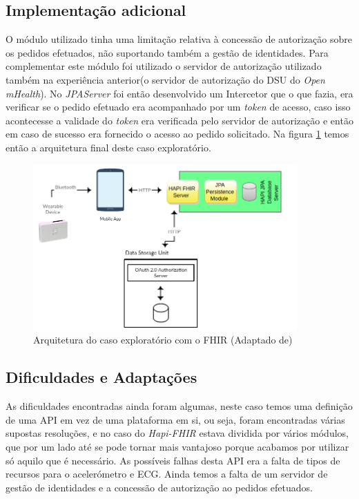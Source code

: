 \subsection{Implementação adicional}
O módulo utilizado tinha uma limitação relativa à concessão de autorização sobre os pedidos efetuados, não suportando também a gestão de identidades. Para complementar este módulo foi utilizado o servidor de autorização utilizado também na experiência anterior(o servidor de autorização do \gls{DSU} do \textit{Open mHealth}).
No \textit{JPAServer} foi então desenvolvido um Intercetor que o que fazia, era verificar se o pedido efetuado era acompanhado por um \textit{token} de acesso, caso isso acontecesse a validade do \textit{token} era verificada pelo servidor de autorização e então em caso de sucesso era fornecido o acesso ao pedido solicitado. Na figura \ref{f:exp-fhir-arch} temos então a arquitetura final deste caso exploratório.
\begin{figure}[H]
  \centering
  \includegraphics[width=0.9\textwidth]{imgs/fhir-arch-exp.png}
  \caption[Arquitetura do caso exploratório com o FHIR]{Arquitetura do caso exploratório com o FHIR (Adaptado de)\cite{hapi-index}}
  
  \label{f:exp-fhir-arch}
\end{figure}

\subsection{Dificuldades e Adaptações}
As dificuldades encontradas ainda foram algumas, neste caso temos uma definição de uma \gls{API} em vez de uma plataforma em si, ou seja, foram encontradas várias supostas resoluções, e no caso do \textit{Hapi-FHIR} estava dividida por vários módulos, que por um lado até se pode tornar mais vantajoso porque acabamos por utilizar só aquilo que é necessário. As possíveis falhas desta \gls{API} era a falta de tipos de recursos para o acelerómetro e \gls{ECG}. Ainda temos a falta de um servidor de gestão de identidades e a concessão de autorização ao pedidos efetuados.

